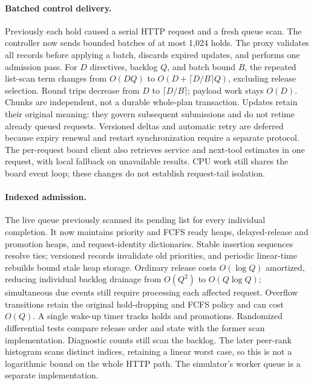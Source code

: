 \paragraph{Batched control delivery.}
Previously each hold caused a serial HTTP request and a fresh queue scan. The
controller now sends bounded batches of at most 1,024 holds. The proxy validates
all records before applying a batch, discards expired updates, and performs one
admission pass. For $D$ directives, backlog $Q$, and batch bound $B$, the repeated
list-scan term changes from $O(DQ)$ to $O(D+\lceil D/B\rceil Q)$, excluding release
selection. Round trips decrease from $D$ to $\lceil D/B\rceil$; payload work stays
$O(D)$. Chunks are independent, not a durable whole-plan transaction. Updates
retain their original meaning: they govern subsequent submissions and do not
retime already queued requests. Versioned deltas and automatic retry are deferred
because expiry renewal and restart synchronization require a separate protocol.
The per-request board client also retrieves service and next-tool estimates in
one request, with local fallback on unavailable results. CPU work still shares
the board event loop; these changes do not establish request-tail isolation.

\paragraph{Indexed admission.}
The live queue previously scanned its pending list for every individual completion.
It now maintains priority and FCFS ready heaps, delayed-release and promotion
heaps, and request-identity dictionaries. Stable insertion sequences resolve ties;
versioned records invalidate old priorities, and periodic linear-time rebuilds
bound stale heap storage. Ordinary release costs $O(\log Q)$ amortized, reducing
individual backlog drainage from $O(Q^2)$ to $O(Q\log Q)$; simultaneous due events
still require processing each affected request. Overflow transitions retain the
original hold-dropping and FCFS policy and can cost $O(Q)$. A single wake-up timer
tracks holds and promotions. Randomized differential tests compare release order
and state with the former scan implementation. Diagnostic counts still scan
the backlog. The later peer-rank histogram scans distinct indices, retaining a
linear worst case, so this is not a logarithmic bound on the whole HTTP path. The simulator's worker queue is a separate implementation.


